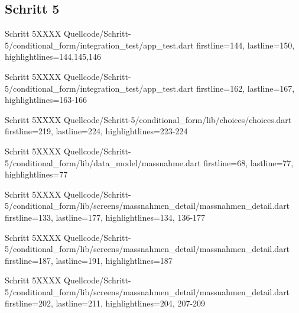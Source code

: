 \ifincludeall \clearpage \fi 


\subsection{Schritt 5}

\begin{alexlisting}{Schritt 5}{XXXX}
    {Quellcode/Schritt-5/conditional_form/integration_test/app_test.dart}
    {firstline=144, lastline=150, highlightlines={144,145,146}}
    \label{lst:Schritt5XXXX}
  \end{alexlisting}

  
\begin{alexlisting}{Schritt 5}{XXXX}
    {Quellcode/Schritt-5/conditional_form/integration_test/app_test.dart}
    {firstline=162, lastline=167, highlightlines={163-166}}
    \label{lst:Schritt5XXXX}
  \end{alexlisting}

  \begin{alexlisting}{Schritt 5}{XXXX}
    {Quellcode/Schritt-5/conditional_form/lib/choices/choices.dart}
    {firstline=219, lastline=224, highlightlines={223-224}}
    \label{lst:Schritt5XXXX}
  \end{alexlisting}

  \begin{alexlisting}{Schritt 5}{XXXX}
    {Quellcode/Schritt-5/conditional_form/lib/data_model/massnahme.dart}
    {firstline=68, lastline=77, highlightlines={77}}
    \label{lst:Schritt5XXXX}
  \end{alexlisting}

  \begin{alexlisting}{Schritt 5}{XXXX}
    {Quellcode/Schritt-5/conditional_form/lib/screens/massnahmen_detail/massnahmen_detail.dart}
    {firstline=133, lastline=177, highlightlines={134, 136-177}}
    \label{lst:Schritt5XXXXX}
  \end{alexlisting}

  \begin{alexlisting}{Schritt 5}{XXXX}
    {Quellcode/Schritt-5/conditional_form/lib/screens/massnahmen_detail/massnahmen_detail.dart}
    {firstline=187, lastline=191, highlightlines={187}}
    \label{lst:Schritt5XXXXX}
  \end{alexlisting}

  \begin{alexlisting}{Schritt 5}{XXXX}
    {Quellcode/Schritt-5/conditional_form/lib/screens/massnahmen_detail/massnahmen_detail.dart}
    {firstline=202, lastline=211, highlightlines={204, 207-209}}
    \label{lst:Schritt5XXXXX}
  \end{alexlisting}

